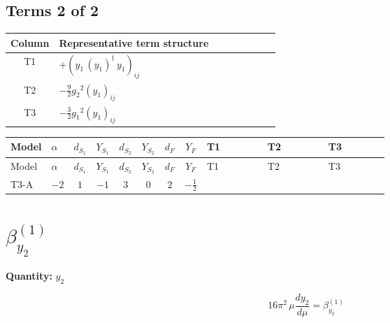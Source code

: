 \documentclass[8pt]{article}
\begin{document}
\begin{landscape}
\subsection*{Terms 2 of 2}
\begin{center}
\begin{tabular}{@{}c >{\raggedright\arraybackslash}p{0.82\linewidth}@{}}
\toprule
Column & Representative term structure \\
\midrule
T1 & \(\displaystyle +\left({y_1}\,\left({y_1}\right)^{\dagger}\,{y_1}\right)_{ij}\) \\
\midrule
T2 & \(\displaystyle -\frac{9}{2} {g_2}^2 \left({y_1}\right)_{ij}\) \\
\midrule
T3 & \(\displaystyle -\frac{3}{2} {g_1}^2 \left({y_1}\right)_{ij}\) \\
\midrule
\bottomrule
\end{tabular}
\end{center}
\smallskip
\tiny
\begin{longtable}{@{}llcccccc >{\raggedright\arraybackslash}p{0.21\linewidth} >{\raggedright\arraybackslash}p{0.21\linewidth} >{\raggedright\arraybackslash}p{0.21\linewidth}@{}}
\toprule
Model & $\alpha$ & $d_{S_1}$ & $Y_{S_1}$ & $d_{S_2}$ & $Y_{S_2}$ & $d_F$ & $Y_F$ & T1 & T2 & T3 \\
\midrule
\endfirsthead
\toprule
Model & $\alpha$ & $d_{S_1}$ & $Y_{S_1}$ & $d_{S_2}$ & $Y_{S_2}$ & $d_F$ & $Y_F$ & T1 & T2 & T3 \\
\midrule
\endhead
T3-A & $-2$ & $1$ & $-1$ & $3$ & $0$ & $2$ & $-\frac{1}{2}$ & \scriptsize\adjustbox{max width=\linewidth}{$\begin{gathered} +\left({y_1}\,\left({y_1}\right)^{\dagger}\,{y_1}\right)_{ij}\end{gathered}$} & \scriptsize\adjustbox{max width=\linewidth}{$\begin{gathered} -\frac{9}{2} {g_2}^2 \left({y_1}\right)_{ij}\end{gathered}$} & \scriptsize\adjustbox{max width=\linewidth}{$\begin{gathered} -\frac{3}{2} {g_1}^2 \left({y_1}\right)_{ij}\end{gathered}$} \\
\midrule
\bottomrule
\end{longtable}
\clearpage
\section*{$\beta_{y_2}^{(1)}$}
\noindent\textbf{Quantity: }$y_2$\par\smallskip
\[16\pi^2\,\mu\frac{d y_2}{d\mu}=\beta_{y_2}^{(1)}\]

\end{landscape}
\end{document}
